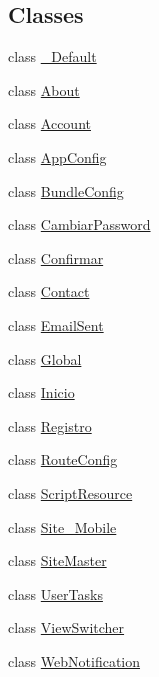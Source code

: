 \subsection*{Classes}
\begin{DoxyCompactItemize}
\item 
class \mbox{\hyperlink{classWebApplication_1_1__Default}{\+\_\+\+Default}}
\item 
class \mbox{\hyperlink{classWebApplication_1_1About}{About}}
\item 
class \mbox{\hyperlink{classWebApplication_1_1Account}{Account}}
\item 
class \mbox{\hyperlink{classWebApplication_1_1AppConfig}{App\+Config}}
\item 
class \mbox{\hyperlink{classWebApplication_1_1BundleConfig}{Bundle\+Config}}
\item 
class \mbox{\hyperlink{classWebApplication_1_1CambiarPassword}{Cambiar\+Password}}
\item 
class \mbox{\hyperlink{classWebApplication_1_1Confirmar}{Confirmar}}
\item 
class \mbox{\hyperlink{classWebApplication_1_1Contact}{Contact}}
\item 
class \mbox{\hyperlink{classWebApplication_1_1EmailSent}{Email\+Sent}}
\item 
class \mbox{\hyperlink{classWebApplication_1_1Global}{Global}}
\item 
class \mbox{\hyperlink{classWebApplication_1_1Inicio}{Inicio}}
\item 
class \mbox{\hyperlink{classWebApplication_1_1Registro}{Registro}}
\item 
class \mbox{\hyperlink{classWebApplication_1_1RouteConfig}{Route\+Config}}
\item 
class \mbox{\hyperlink{classWebApplication_1_1ScriptResource}{Script\+Resource}}
\item 
class \mbox{\hyperlink{classWebApplication_1_1Site__Mobile}{Site\+\_\+\+Mobile}}
\item 
class \mbox{\hyperlink{classWebApplication_1_1SiteMaster}{Site\+Master}}
\item 
class \mbox{\hyperlink{classWebApplication_1_1UserTasks}{User\+Tasks}}
\item 
class \mbox{\hyperlink{classWebApplication_1_1ViewSwitcher}{View\+Switcher}}
\item 
class \mbox{\hyperlink{classWebApplication_1_1WebNotification}{Web\+Notification}}
\end{DoxyCompactItemize}
